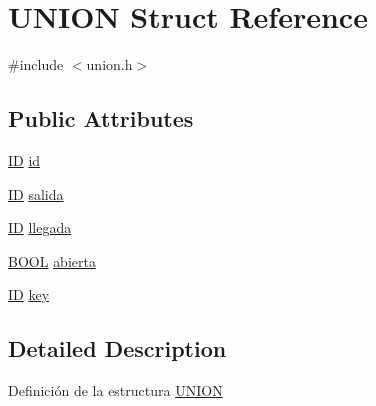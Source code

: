 \hypertarget{structUNION}{
\section{UNION Struct Reference}
\label{structUNION}
}


{\ttfamily \#include $<$union.h$>$}

\subsection*{Public Attributes}
\begin{DoxyCompactItemize}
\item 
\hyperlink{tipos_8h_a483fb3895d39b2ee95d50073243d077e}{ID} \hyperlink{structUNION_a8b9021fceafdff62398a23b3d3252d3e}{id}
\item 
\hyperlink{tipos_8h_a483fb3895d39b2ee95d50073243d077e}{ID} \hyperlink{structUNION_a8a53fe8ab30b37bf9a9a1a2c1ad11ec6}{salida}
\item 
\hyperlink{tipos_8h_a483fb3895d39b2ee95d50073243d077e}{ID} \hyperlink{structUNION_af5469a62faabf95b2ca099dc5a8f8597}{llegada}
\item 
\hyperlink{tipos_8h_a3e5b8192e7d9ffaf3542f1210aec18dd}{BOOL} \hyperlink{structUNION_a8dab50459c23208c07cbcb893d41398d}{abierta}
\item 
\hyperlink{tipos_8h_a483fb3895d39b2ee95d50073243d077e}{ID} \hyperlink{structUNION_a567a8ca18956fc6363d60a6e8e2e3a8c}{key}
\end{DoxyCompactItemize}


\subsection{Detailed Description}
Definición de la estructura \hyperlink{structUNION}{UNION} 

